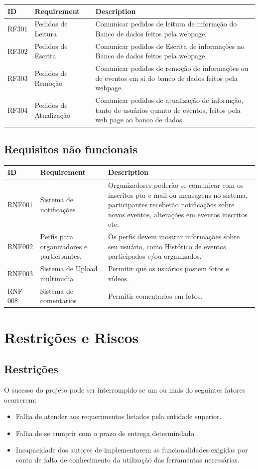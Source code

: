 \begin{tabular}{>{\raggedright}p{1.5cm}>{\raggedright}p{4cm}>{\raggedright}p{10cm}}
\toprule
\textbf{ID} & \textbf{Requirement} & \textbf{Description} \tabularnewline 
\midrule
  RF301 & Pedidos de Leitura & Comunicar pedidos de leitura de informção do Banco de dados feitos pela webpage. \tabularnewline \hline
  RF302 & Pedidos de Escrita & Comunicar pedidos de Escrita de informações no Banco de dados feitos pela webpage.\tabularnewline \hline
  RF303 & Pedidos de Remoção & Comunicar pedidos de remoção de informações ou de eventos em si do banco de dados feitos pela webpage.\tabularnewline \hline
  RF304 & Pedidos de Atualização & Comunicar pedidos de atualização de informção, tanto de usuários quanto de eventos, feitos pela web page ao banco de dados.\tabularnewline 
\bottomrule
\end{tabular}


\section{Requisitos não funcionais}
\begin{tabular}{>{\raggedright}p{1.5cm}>{\raggedright}p{4cm}>{\raggedright}p{10cm}}
\toprule
\textbf{ID} & \textbf{Requirement} & \textbf{Description} \tabularnewline 
\midrule
RNF001 & Sistema de notificações & Organizadores poderão se comunicar com os inscritos por e-mail ou mensagens no sistema, participantes receberão notiﬁcações sobre novos eventos, alterações em eventos inscritos etc. \tabularnewline \hline
RNF002 & Perﬁs para organizadores e participantes. & Os perfis devem mostrar informações sobre seu usuário, como Histórico de eventos participados e/ou organizados. \tabularnewline \hline
RNF003 & Sistema de Upload multimidia & Permitir que os usuários postem fotos e vídeos. \tabularnewline \hline 
RNF-008 & Sistema de comentarios & Permitir comentarios em fotos.\tabularnewline

\bottomrule
\end{tabular}


\chapter{Restrições e Riscos}

\section{Restrições}
    O sucesso do projeto pode ser interrompido se um ou mais do seguintes fatores ocorrerem:
    \begin{itemize}
        \item Falha de atender aos requerimentos listados pela entidade superior.
        \item Falha de se cumprir com o prazo de entrega determindado.
        \item Incapacidade dos autores de implementarem as funcionalidades exigidas por conta de falta de conhecimento da utilização das ferramentas necessárias.
    \end{itemize}


